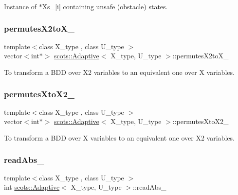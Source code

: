 Instance of $\ast$\+Xs\+\_\+\mbox{[}i\mbox{]} containing unsafe (obstacle) states. \mbox{\label{classscots_1_1Adaptive_a88edb6662310c07120d07c9dff968ddc}} 
\subsubsection{\texorpdfstring{permutes\+X2to\+X\+\_\+}{permutesX2toX\_}}
{\footnotesize\ttfamily template$<$class X\+\_\+type , class U\+\_\+type $>$ \\
vector$<$int$\ast$$>$ \hyperlink{classscots_1_1Adaptive}{scots\+::\+Adaptive}$<$ X\+\_\+type, U\+\_\+type $>$\+::permutes\+X2to\+X\+\_\+}

To transform a B\+DD over X2 variables to an equivalent one over X variables. \mbox{\label{classscots_1_1Adaptive_ae954d4d3177bdc4093530e254ace2b34}} 
\subsubsection{\texorpdfstring{permutes\+Xto\+X2\+\_\+}{permutesXtoX2\_}}
{\footnotesize\ttfamily template$<$class X\+\_\+type , class U\+\_\+type $>$ \\
vector$<$int$\ast$$>$ \hyperlink{classscots_1_1Adaptive}{scots\+::\+Adaptive}$<$ X\+\_\+type, U\+\_\+type $>$\+::permutes\+Xto\+X2\+\_\+}

To transform a B\+DD over X variables to an equivalent one over X2 variables. \mbox{\label{classscots_1_1Adaptive_a8c2a7e89feeb75f0b51fdf9c8d1359e7}} 
\subsubsection{\texorpdfstring{read\+Abs\+\_\+}{readAbs\_}}
{\footnotesize\ttfamily template$<$class X\+\_\+type , class U\+\_\+type $>$ \\
int \hyperlink{classscots_1_1Adaptive}{scots\+::\+Adaptive}$<$ X\+\_\+type, U\+\_\+type $>$\+::read\+Abs\+\_\+}

